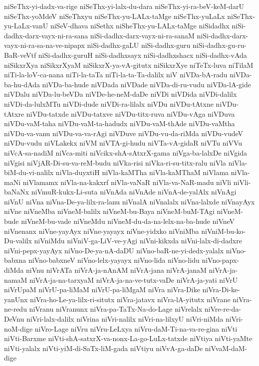 {niSeThx-yi-dadx-va-rige
niSeThx-yi-lalx-du-dara
niSeThx-yi-ra-beV-keM-darU
niSeThx-yoMdeV
niSeThxyu
niSeThx-yu-LALx-taMge
niSeThx-yuLaLx
niSeThx-yu-LaLx-vanU
niSeV-dhava
niSethx
niSheThx-yu-LALx-taMge
niSidadhx
niSi-dadhx-darx-vayx-ni-ra-sana
niSi-dadhx-darx-vayx-ni-ra-sanaM
niSi-dadhx-darx-vayx-ni-ra-sa-na-ve-nipapx
niSi-dadhx-gaLU
niSi-dadhx-guru
niSi-dadhx-gu-ru-BaR-veVtf
niSi-dadhx-guruH
niSi-dadhxsayx
niSi-dadhxshacx
niSi-dadhx-vAda
niSikxrXya
niSikxrXyaM
niSikxrX-ya-vA-gitutx
niSikxrXye
niTeTx-luva
niTilaM
niTi-la-loV-ca-nana
niTi-la-taTa
niTi-la-ta-Ta-dalilx
niV
niVDa-bA-radu
niVDa-ba-hu-dAda
niVDa-ba-hude
niVDada
niVDade
niVDa-di-ru-vudu
niVDa-lA-gide
niVDalu
niVDa-lu-beVDa
niVDe-he-neM-daDe
niVDi
niVDida
niVDi-dalilx
niVDi-da-lulxMTu
niVDi-dude
niVDi-ra-lilalx
niVDu
niVDu-tAtxne
niVDu-tAtxre
niVDu-tatxde
niVDu-tatxve
niVDu-titx-ruva
niVDu-vAga
niVDuva
niVDu-vaM-taha
niVDu-vaM-ta-hadudx
niVDu-vaM-thAde
niVDu-vaMtha
niVDu-va-vanu
niVDu-va-va-rAgi
niVDuve
niVDu-vu-da-riMda
niVDu-vudeV
niVDu-vudu
niVLakekx
niVM
niVTA-gi-hudu
niVTa-vA-gidaR
niVTu
niVVu
niVcA-sa-nadiM
niVca-miti
niVcikx-shA-sAtxrX-gama
niVga-ba-lalxDe
niVgida
niVgisi
niVjAR-Di-su-va-reM-budu
niVka-risi
niVka-ri-su-titx-ralu
niVla
niVla-biM-du-vi-nalilx
niVla-duyxtiH
niVla-kaMTha
niVla-kaMThaM
niVlama
niVla-maNi
niVlamamx
niVla-na-kakxrf
niVla-vaNaR
niVla-va-NaR-madu
niVli
niVli-baNaNx
niVmuR-kukx-Li-suta
niVnAda
niVnAde
niVnA-de-yalAlx
niVnAgi
niVnU
niVna
niVna-De-ya-lilx-ra-lanu
niVnalA
niVnalalx
niVna-lalxde
niVnayAyx
niVne
niVneMba
niVneM-balilx
niVneM-bu-Baya
niVneM-buM-TAgi
niVneM-bude
niVneM-bu-vade
niVneMdu
niVneM-du-da-na-lelx-na-ba-hude
niVneV
niVnenanx
niVne-yayAyx
niVne-yayayx
niVne-yidxko
niVniMba
niVniM-bu-ko-Du-valilx
niVniMdu
niVniV-ga-LiV-ve-yAgi
niVni-kikxda
niVni-lalx-di-dadxre
niVni-pepx-yayAyx
niVno-De-ya-nA-daDU
niVno-baR-ne-yi-dedx-yalalx
niVno-babxna
niVno-babxneV
niVno-lelx-yayayx
niVno-lida
niVno-lidu
niVno-papx-diMda
niVnu
niVrATa
niVrA-ja-nAnAM
niVrA-jana
niVrA-janaM
niVrA-ja-namaM
niVrA-ja-na-tarxyaM
niVrA-ja-na-ve-tutx-vaDe
niVrA-ja-yati
niVrU
niVrUpaM
niVrU-pa-liMaM
niVrU-pa-liMgaM
niVra
niVra-Dike
niVra-Di-ke-yanUnx
niVra-ho-Le-ya-lilx-ri-situtx
niVra-jatavx
niVra-lA-yitutx
niVrane
niVra-ne-redu
niVranu
niVranunx
niVra-pa-TaTx-Na-do-Lage
niVrelalx
niVre-re-da-DeVnu
niVri-lalx-dalilx
niVrina
niVri-nalilx
niVri-na-lilxyU
niVri-niMda
niVri-noM-dige
niVro-Lage
niVru
niVru-LeLxya
niVru-daM-Ti-na-va-re-gina
niVti
niVti-Barxme
niVti-shA-satxrX-va-nonx-La-go-LuLx-tatxde
niVtiya
niVti-yaMte
niVti-yalalx
niVti-yiM-di-SaTx-liM-gada
niVtiyu
niVvA-ga-daDe
niVvaM-daM-dige
}
